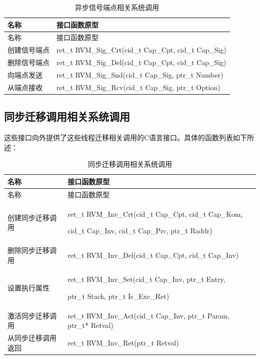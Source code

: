 \begin{xltabular}{\textwidth}{@{}>{\hsize\raggedright\arraybackslash}X>{\hsize\raggedright\arraybackslash}X@{}}
\caption{异步信号端点相关系统调用}\label{tab:3-10}\\
\toprule
名称 & 接口函数原型\tabularnewline
\endfirsthead
\toprule
名称 & 接口函数原型\tabularnewline
\midrule
\endhead
\bottomrule
\endlastfoot
创建信号端点 & ret\_\allowbreak{}t RVM\_\allowbreak{}Sig\_\allowbreak{}Crt(cid\_\allowbreak{}t Cap\_\allowbreak{}Cpt, cid\_\allowbreak{}t
Cap\_\allowbreak{}Sig)\tabularnewline
删除信号端点 & ret\_\allowbreak{}t RVM\_\allowbreak{}Sig\_\allowbreak{}Del(cid\_\allowbreak{}t Cap\_\allowbreak{}Cpt, cid\_\allowbreak{}t
Cap\_\allowbreak{}Sig)\tabularnewline
向端点发送 & ret\_\allowbreak{}t RVM\_\allowbreak{}Sig\_\allowbreak{}Snd(cid\_\allowbreak{}t Cap\_\allowbreak{}Sig, ptr\_\allowbreak{}t
Number)\tabularnewline
从端点接收 & ret\_\allowbreak{}t RVM\_\allowbreak{}Sig\_\allowbreak{}Rcv(cid\_\allowbreak{}t Cap\_\allowbreak{}Sig, ptr\_\allowbreak{}t
Option)\tabularnewline
\end{xltabular}

\subsection{同步迁移调用相关系统调用}\label{subsec:3-5-7}

这些接口向外提供了这些线程迁移相关调用的C语言接口。具体的函数列表如下所述：

\begin{xltabular}{\textwidth}{@{}>{\hsize\raggedright\arraybackslash}X>{\hsize\raggedright\arraybackslash}X@{}}
\caption{同步迁移调用相关系统调用}\label{tab:3-11}\\
\toprule
名称 & 接口函数原型\tabularnewline
\endfirsthead
\toprule
名称 & 接口函数原型\tabularnewline
\midrule
\endhead
\bottomrule
\endlastfoot
创建同步迁移调用\strut
 & ret\_\allowbreak{}t RVM\_\allowbreak{}Inv\_\allowbreak{}Crt(cid\_\allowbreak{}t Cap\_\allowbreak{}Cpt, cid\_\allowbreak{}t Cap\_\allowbreak{}Kom,

cid\_\allowbreak{}t Cap\_\allowbreak{}Inv, cid\_\allowbreak{}t Cap\_\allowbreak{}Prc, ptr\_\allowbreak{}t Raddr)\strut
\tabularnewline
删除同步迁移调用 & ret\_\allowbreak{}t RVM\_\allowbreak{}Inv\_\allowbreak{}Del(cid\_\allowbreak{}t Cap\_\allowbreak{}Cpt, cid\_\allowbreak{}t
Cap\_\allowbreak{}Inv)\tabularnewline
设置执行属性\strut
 & ret\_\allowbreak{}t RVM\_\allowbreak{}Inv\_\allowbreak{}Set(cid\_\allowbreak{}t Cap\_\allowbreak{}Inv, ptr\_\allowbreak{}t Entry,

ptr\_\allowbreak{}t Stack, ptr\_\allowbreak{}t Is\_\allowbreak{}Exc\_\allowbreak{}Ret)\strut
\tabularnewline
激活同步迁移调用 & ret\_\allowbreak{}t RVM\_\allowbreak{}Inv\_\allowbreak{}Act(cid\_\allowbreak{}t Cap\_\allowbreak{}Inv, ptr\_\allowbreak{}t Param,
ptr\_\allowbreak{}t* Retval)\tabularnewline
从同步迁移调用返回 & ret\_\allowbreak{}t RVM\_\allowbreak{}Inv\_\allowbreak{}Ret(ptr\_\allowbreak{}t Retval)\tabularnewline
\end{xltabular}

